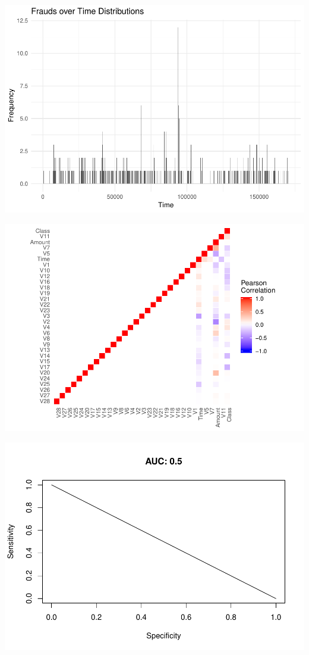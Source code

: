 \documentclass[]{article}
\begin{document}
\begin{center}\includegraphics{Credit_Card_Fraud_Detection_Project_Report_files/figure-latex/unnamed-chunk-25-3} \end{center}

\begin{center}\includegraphics{Credit_Card_Fraud_Detection_Project_Report_files/figure-latex/unnamed-chunk-25-4} \end{center}

\begin{center}\includegraphics{Credit_Card_Fraud_Detection_Project_Report_files/figure-latex/unnamed-chunk-25-5} \end{center}
\end{document}
